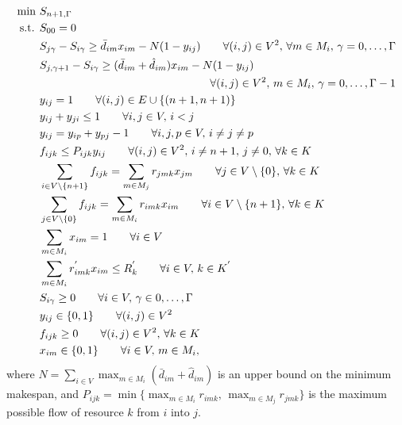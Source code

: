 \documentclass[a4paper,abstracton]{scrartcl}
\begin{document}
\begin{align}
\min \ & S_{n+1,\Gamma}\label{eqn:compact1}\\
\text{s.t. } & S_{00}=0\label{eqn:compact2}\\
	     & S_{j\gamma} - S_{i\gamma} \geq \bar{d}_{im}x_{im} - N(1-y_{ij}) \qquad \forall (i,j)\in V^2,\,\forall m\in M_i,\,\gamma=0,\dots,\Gamma\label{eqn:compact_bigM1}\\
	     & S_{j,\gamma+1} - S_{i\gamma} \geq (\bar{d}_{im} + \hat{d}_{im})x_{im} - N(1-y_{ij})\nonumber \\
	     & & \hspace{-8cm} \forall (i,j)\in V^2,\, m\in M_i,\,\gamma = 0,\dots,\Gamma-1\label{eqn:compact_bigM2}\\
	     & y_{ij}=1 \qquad \forall (i,j) \in E\cup\{(n+1,n+1)\}\label{eqn:compact5}\\
	     & y_{ij} + y_{ji} \leq 1 \qquad \forall i,j\in V,\, i<j\label{eqn:compact_trans1}\\
	     & y_{ij} = y_{ip} + y_{p j} - 1 \qquad \forall i,j,p\in V,\,i\neq j\neq p\label{eqn:compact_trans2}\\
	     & f_{ijk}\leq P_{ijk}y_{ij} \qquad \forall (i,j)\in V^2,\,i\neq n+1,\,j\neq0,\, \forall k \in K\label{eqn:compact6}\\
	     & \sum_{i\in V\setminus\{n+1\}}f_{ijk}=\sum_{m\in M_j}r_{jmk}x_{jm} \qquad \forall j \in V\setminus\{0\} ,\, \forall k\in K\label{eqn:compact7}\\
	     & \sum_{j\in V\setminus\{0\}}f_{ijk}=\sum_{m\in M_i}r_{imk}x_{im} \qquad \forall i \in V\setminus\{n+1\},\,\forall k\in K\label{eqn:compact8}\\
	     & \sum_{m\in M_i}x_{im} = 1 \qquad \forall i\in V\label{eqn:compact9}\\
	     & \sum_{m\in M_i}r^{'}_{imk}x_{im} \leq R^{'}_k \qquad \forall i \in V,\,k\in K^{'}\label{eqn:compact_nonrenewable}\\
	     & S_{i\gamma}\geq 0 \qquad \forall i\in V,\,\gamma \in 0,\dots, \Gamma\label{eqn:compact10}\\
	     & y_{ij}\in\{0,1\} \qquad \forall (i,j)\in V^2\label{eqn:compact11}\\
	     & f_{ijk}\geq 0 \qquad \forall (i,j)\in V^2 ,\, \forall k \in K\label{eqn:compact12}\\
	     & x_{im}\in\{0,1\} \qquad \forall i\in V,\,m\in M_i\label{eqn:compact13},
\end{align}
where $N=\sum_{i\in V}\max_{m\in M_i}(\bar{d}_{im}+\hat{d}_{im})$ is an upper bound on the minimum makespan, and $P_{ijk}=\min\{\max_{m\in M_i}r_{imk},\,\max_{m\in M_j} r_{jmk}\}$ is the maximum possible flow of resource $k$ from $i$ into $j$.
\end{document}
